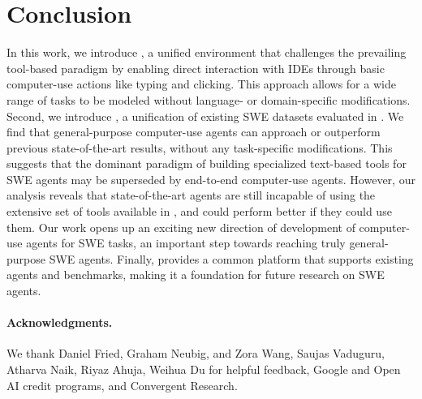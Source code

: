 \section{Conclusion}

In this work, we introduce \ours{}, a unified environment that challenges the prevailing tool-based paradigm by enabling direct interaction with IDEs through basic computer-use actions like typing and clicking. This approach allows for a wide range of tasks to be modeled without language- or domain-specific modifications.
Second, we introduce \bench{}, a unification of existing SWE datasets evaluated in \ours{}.
We find that general-purpose computer-use agents can approach or outperform previous state-of-the-art results, without any task-specific modifications. This suggests that the dominant paradigm of building specialized text-based tools for SWE agents may be superseded by end-to-end computer-use agents. However, our analysis reveals that state-of-the-art agents are still incapable of using the extensive set of tools available in \ours{}, and could perform better if they could use them.
Our work opens up an exciting new direction of development of computer-use agents for SWE tasks, an important step towards reaching truly general-purpose SWE agents. Finally, \ours{} provides a common platform that supports existing agents and benchmarks,  making it a foundation for future research on SWE agents.

\paragraph{Acknowledgments.} We thank Daniel Fried, Graham Neubig, and Zora Wang, Saujas Vaduguru, Atharva Naik, Riyaz Ahuja, Weihua Du for helpful feedback, Google and Open AI credit programs, and Convergent Research.
